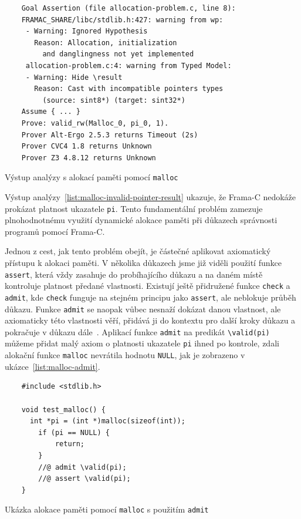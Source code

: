 \begin{listing}[H]
    \begin{verbatim}
    Goal Assertion (file allocation-problem.c, line 8):
    FRAMAC_SHARE/libc/stdlib.h:427: warning from wp:
     - Warning: Ignored Hypothesis
       Reason: Allocation, initialization
         and danglingness not yet implemented
     allocation-problem.c:4: warning from Typed Model:
     - Warning: Hide \result
       Reason: Cast with incompatible pointers types
         (source: sint8*) (target: sint32*)
    Assume { ... }
    Prove: valid_rw(Malloc_0, pi_0, 1).
    Prover Alt-Ergo 2.5.3 returns Timeout (2s)
    Prover CVC4 1.8 returns Unknown
    Prover Z3 4.8.12 returns Unknown
    \end{verbatim}
    \caption{Výstup analýzy s alokací paměti pomocí \texttt{malloc}}
    \label{list:malloc-invalid-pointer-result}
\end{listing}

Výstup analýzy~\ref{list:malloc-invalid-pointer-result} ukazuje,
že Frama\mbox{-}C nedokáže prokázat platnost ukazatele \texttt{pi}.
Tento fundamentální problém zamezuje plnohodnotnému využití dynamické alokace paměti
při důkazech správnosti programů pomocí Frama\mbox{-}C\@.

Jednou z cest, jak tento problém obejít,
je částečné aplikovat axiomatický přístupu k alokaci paměti.
V několika důkazech jsme již viděli použití funkce \texttt{assert},
která vždy zasahuje do probíhajícího důkazu a na daném místě kontroluje platnost předané vlastnosti.
Existují ještě přidružené funkce \texttt{check} a \texttt{admit},
kde \texttt{check} funguje na stejném principu jako \texttt{assert},
ale neblokuje průběh důkazu.
Funkce \texttt{admit} se naopak vůbec nesnaží dokázat danou vlastnost,
ale axiomaticky této vlastnosti věří, přidává ji do kontextu pro další kroky důkazu
a pokračuje v důkazu dále~\cite{ACSLSpec}.
Aplikací funkce \texttt{admit} na predikát \texttt{\textbackslash valid(pi)}
můžeme přidat malý axiom o platnosti ukazatele \texttt{pi} ihned po kontrole,
zdali alokační funkce \texttt{malloc} nevrátila hodnotu \texttt{NULL},
jak je zobrazeno v ukázce~\ref{list:malloc-admit}.

\begin{listing}[H]
    \begin{verbatim}
    #include <stdlib.h>

    void test_malloc() {
      int *pi = (int *)malloc(sizeof(int));
        if (pi == NULL) {
            return;
        }
        //@ admit \valid(pi);
        //@ assert \valid(pi);
    }
    \end{verbatim}
    \caption{Ukázka alokace paměti pomocí \texttt{malloc} s použitím \texttt{admit}}
    \label{list:malloc-admit}
\end{listing}

